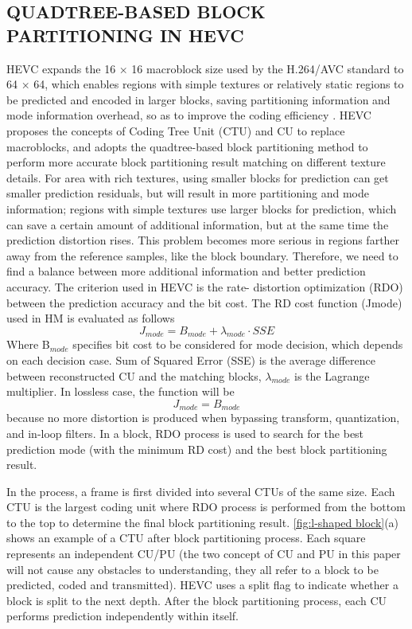 \documentclass[journal]{IEEEtran}
\begin{document}
\subsection{QUADTREE-BASED BLOCK PARTITIONING IN HEVC}
HEVC expands the 16 × 16 macroblock size used by the H.264/AVC standard to 64 × 64, which enables regions with simple textures or relatively static regions to be predicted and encoded in larger blocks, saving partitioning information and mode information overhead, so as to improve the coding efficiency . HEVC proposes the concepts of Coding  Tree Unit (CTU) and CU to replace macroblocks, and adopts the quadtree-based block partitioning method to perform more accurate block partitioning result matching on different texture details. For area with rich textures, using smaller blocks for prediction can get smaller prediction  residuals,  but will result in more partitioning and mode information; regions with simple textures use larger blocks for prediction, which can save a certain amount of additional information,  but at the same time the prediction distortion rises. This problem becomes more serious in regions farther away from the reference samples, like the block boundary. Therefore, we need to find a balance between more additional information and better prediction accuracy. The criterion used in HEVC is the rate- distortion optimization (RDO) between the prediction accuracy and the bit cost. The RD cost function (Jmode) used in HM is evaluated as follows \cite{17}
\begin{equation}
J_{mode}=B_{mode}+\lambda_{mode}\cdot SSE
\end{equation}
Where B$_{mode}$ specifies bit cost to be considered for mode decision, which depends on each decision case. Sum of Squared Error (SSE) is the average difference between reconstructed CU and the matching blocks, $\lambda_{mode}$ is the Lagrange multiplier. In lossless case, the function will be
\begin{equation}
J_{mode}=B_{mode}
\label{RDo}
\end{equation}
because no more distortion is produced when bypassing transform, quantization, and in-loop filters. In a block, RDO process is used to search for the best prediction mode (with the minimum RD cost) and the best block partitioning result.

In the process, a frame is first divided into several CTUs of the same size. Each CTU is the largest coding unit where RDO process is performed from the bottom to the top to determine the final block partitioning result. \autoref{fig:l-shaped block}(a) shows an example of a CTU after block partitioning process. Each square represents an independent CU/PU (the two concept of CU and PU in this paper will not cause any obstacles to understanding, they all refer to a block to be predicted, coded and transmitted). HEVC uses a split flag to indicate whether a block is split to the next depth. After the block partitioning process, each CU performs prediction independently within itself.
\end{document}
